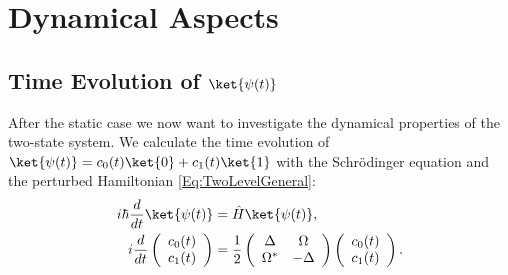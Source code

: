 \section{Dynamical Aspects}
\subsection{Time Evolution of $\ket{\psi(t)}$}
 After the static case we now want to investigate the dynamical properties of the two-state system. We calculate the time evolution of $\ket{\psi(t)} = c_0(t)\ket{0} + c_1(t)\ket{1}$ with the Schrödinger equation and the perturbed Hamiltonian \eqref{Eq:TwoLevelGeneral}:
\begin{align}
i\hbar \frac{d}{dt}\ket{\psi(t)}&=\hat{H}\ket{\psi(t)},\\
i \frac{d}{dt}\left(\begin{array}{c} c_0(t) \\ c_1(t) \end{array}\right) &= \frac{1}{2}\left( \begin{array}{cc} \Delta & \Omega \\ \Omega^* & -\Delta \end{array} \right) \left(\begin{array}{c} c_0(t) \\ c_1(t) \end{array} \right).
\end{align}


